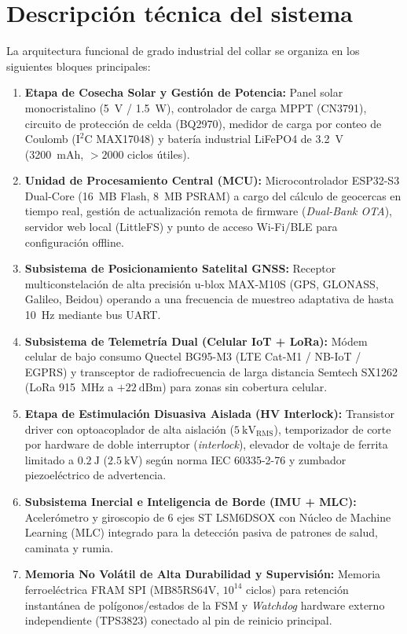 \section*{Descripción técnica del sistema}
La arquitectura funcional de grado industrial del collar se organiza en los siguientes bloques principales:

\begin{enumerate}[leftmargin=*]
    \item \textbf{Etapa de Cosecha Solar y Gestión de Potencia:} Panel solar monocristalino (5~V / 1.5~W), controlador de carga MPPT (CN3791), circuito de protección de celda (BQ2970), medidor de carga por conteo de Coulomb ($\text{I}^2\text{C}$ MAX17048) y batería industrial LiFePO4 de 3.2~V (3200~mAh, $>2000$ ciclos útiles).
    \item \textbf{Unidad de Procesamiento Central (MCU):} Microcontrolador ESP32-S3 Dual-Core (16~MB Flash, 8~MB PSRAM) a cargo del cálculo de geocercas en tiempo real, gestión de actualización remota de firmware (\textit{Dual-Bank OTA}), servidor web local (LittleFS) y punto de acceso Wi-Fi/BLE para configuración offline.
    \item \textbf{Subsistema de Posicionamiento Satelital GNSS:} Receptor multiconstelación de alta precisión u-blox MAX-M10S (GPS, GLONASS, Galileo, Beidou) operando a una frecuencia de muestreo adaptativa de hasta 10~Hz mediante bus UART.
    \item \textbf{Subsistema de Telemetría Dual (Celular IoT + LoRa):} Módem celular de bajo consumo Quectel BG95-M3 (LTE Cat-M1 / NB-IoT / EGPRS) y transceptor de radiofrecuencia de larga distancia Semtech SX1262 (LoRa 915~MHz a $+22~\text{dBm}$) para zonas sin cobertura celular.
    \item \textbf{Etapa de Estimulación Disuasiva Aislada (HV Interlock):} Transistor driver con optoacoplador de alta aislación ($5~\text{kV}_{\text{RMS}}$), temporizador de corte por hardware de doble interruptor (\textit{interlock}), elevador de voltaje de ferrita limitado a $0.2~\text{J}$ ($2.5~\text{kV}$) según norma IEC 60335-2-76 y zumbador piezoeléctrico de advertencia.
    \item \textbf{Subsistema Inercial e Inteligencia de Borde (IMU + MLC):} Acelerómetro y giroscopio de 6 ejes ST LSM6DSOX con Núcleo de Machine Learning (MLC) integrado para la detección pasiva de patrones de salud, caminata y rumia.
    \item \textbf{Memoria No Volátil de Alta Durabilidad y Supervisión:} Memoria ferroeléctrica FRAM SPI (MB85RS64V, $10^{14}$ ciclos) para retención instantánea de polígonos/estados de la FSM y \textit{Watchdog} hardware externo independiente (TPS3823) conectado al pin de reinicio principal.
\end{enumerate}